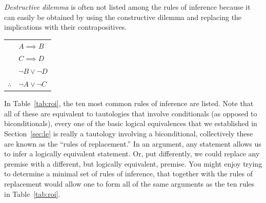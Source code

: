 \emph{Destructive dilemma} 
is often not listed among the rules
of inference because it can easily be obtained by using the constructive
dilemma and replacing the implications with their contrapositives.

\begin{center}
\begin{tabular}{cl}
 & $A \implies B$ \\
 & $C \implies D$ \\ 
 & ${\lnot}B \lor {\lnot}D$ \\ \hline
$\therefore$ & ${\lnot}A \lor {\lnot}C$ \\
\end{tabular}
\end{center}

In Table~\ref{tab:roi}, the ten most common 
rules of inference are listed.  
Note that all of these are equivalent to tautologies that
involve conditionals (as opposed to biconditionals), every one of the 
basic logical equivalences that we established in Section~\ref{sec:le}
is really a tautology involving a biconditional, collectively these are
known as the ``rules of replacement.''  
In an argument, any statement
allows us to infer a logically equivalent statement.  Or, put differently,
we could replace any premise with a different, but logically equivalent,
premise.  You might enjoy trying to determine a minimal set of rules of
inference, that together with the rules of replacement would allow one
to form all of the same arguments as the ten rules in Table~\ref{tab:roi}.
  
